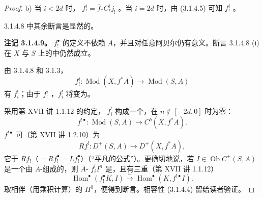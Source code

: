 \begin{proof}
b) 当 $i<2d$ 时， $f_!^i=\overline f_*C^i_{\ell}j_!$ 。当 $i=2d$ 时，由 (3.1.4.5) 可知 $f_!^i$ 。

3.1.4.8 中其余断言是显然的。

\textbf{注记 3.1.4.9。} $f_!^\bullet$ 的定义不依赖 $A$，并且对任意阿贝尔仍有意义。断言 3.1.4.8 (i) 在 $X$ 与 $S$ 上的中仍然成立。

由 3.1.4.8 和 3.1.3，
\[
 f_!^i\colon\operatorname{Mod}(X,f^*A)\longrightarrow\operatorname{Mod}(S,A)
\]
有 $f_i^!$；由于 $f_!^i$ ，$f_i^!$ 将变为。

采用第 XVII 讲 1.1.12 的约定， $f_i^!$ 构成一个，在 $n\notin[-2d,0]$ 时为零：
\[
 f^{!\bullet}\colon\operatorname{Mod}(S,A)\longrightarrow C^b(X,f^*A).\tag{3.1.4.10}
\]
 $f^{!\bullet}$ 可（第 XVII 讲 1.2.10）为
\[
 Rf^!\colon D^+(S,A)\longrightarrow D^+(X,f^*A),\tag{3.1.4.11}
\]
它于 $Rf_!$（$=Rf_!^\bullet=Lf_!^\bullet$）（“平凡的公式”）。更确切地说，若 $I\in\operatorname{Ob}C^+(S,A)$ 是一个由 $A$-组成的，则 $A$- $f_i^!I^n$ 是，且有三重（第 XVII 讲 1.1.12）
\[
 \operatorname{Hom}^\bullet(f_!^\bullet K,I)\xrightarrow{\sim}
 \operatorname{Hom}^\bullet(K,f^{!\bullet}I).\tag{3.1.4.12}
\]
取相伴（用乘积计算）的 $H^0$，便得到断言。相容性 (3.1.4.4) 留给读者验证。
\end{proof}

